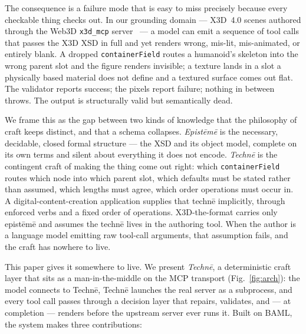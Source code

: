 \documentclass[sigconf,nonacm,screen,anonymous]{acmart}
\begin{document}
The consequence is a failure mode that is easy to miss precisely because every checkable thing checks out. In our grounding domain --- X3D~4.0 scenes authored through the Web3D \texttt{x3d\_mcp} server~\cite{x3d4,x3dpy} --- a model can emit a sequence of tool calls that passes the X3D XSD in full and yet renders wrong, mis-lit, mis-animated, or entirely blank. A dropped \texttt{containerField} routes a humanoid's skeleton into the wrong parent slot and the figure renders invisible; a texture lands in a slot a physically based material does not define and a textured surface comes out flat. The validator reports success; the pixels report failure; nothing in between throws. The output is structurally valid but semantically dead.

We frame this as the gap between two kinds of knowledge that the philosophy of craft keeps distinct, and that a schema collapses. \emph{Epistēmē} is the necessary, decidable, closed formal structure --- the XSD and its object model, complete on its own terms and silent about everything it does not encode. \emph{Technē} is the contingent craft of making the thing come out right: which \texttt{containerField} routes which node into which parent slot, which defaults must be stated rather than assumed, which lengths must agree, which order operations must occur in. A digital-content-creation application supplies that technē implicitly, through enforced verbs and a fixed order of operations. X3D-the-format carries only epistēmē and assumes the technē lives in the authoring tool. When the author is a language model emitting raw tool-call arguments, that assumption fails, and the craft has nowhere to live.

This paper gives it somewhere to live. We present \emph{Technē}, a deterministic craft layer that sits as a man-in-the-middle on the MCP transport (Fig.~\ref{fig:arch}): the model connects to Technē, Technē launches the real server as a subprocess, and every tool call passes through a decision layer that repairs, validates, and --- at completion --- renders before the upstream server ever runs it. Built on BAML, the system makes three contributions:
\end{document}
